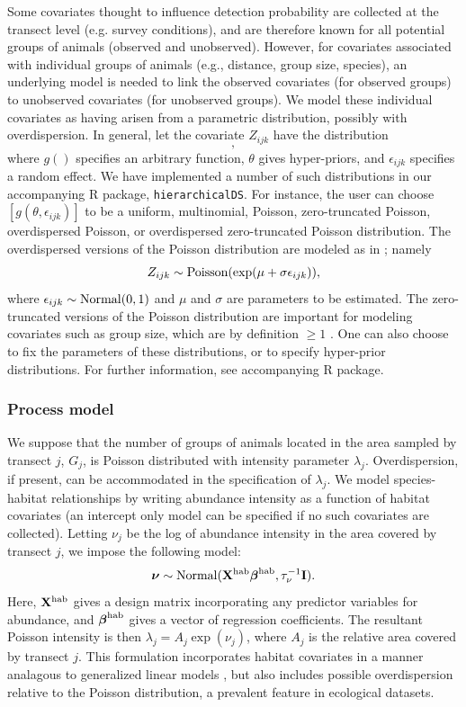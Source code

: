 \documentclass[10pt]{article}
\begin{document}
Some covariates thought to influence detection probability are collected at the transect level (e.g. survey conditions), and are therefore known for all potential groups of animals (observed and unobserved).  However, for covariates associated with individual groups of animals (e.g., distance, group size, species), an underlying model is needed to link the observed covariates (for observed groups) to unobserved covariates (for unobserved groups).  We model these individual covariates as having arisen from a parametric distribution, possibly with overdispersion.  In general, let the covariate $Z_{ijk}$ have the distribution
\begin{equation}
[g(\theta,\epsilon_{ijk})],
\label{eq:cov.dist}
\end{equation}
where $g()$ specifies an arbitrary function, $\theta$ gives hyper-priors, and $\epsilon_{ijk}$ specifies a random effect.  We have implemented a number of such distributions in our accompanying R package, {\tt hierarchicalDS}.  For instance, the user can choose $[g(\theta,\epsilon_{ijk})]$ to be a uniform, multinomial, Poisson, zero-truncated Poisson, overdispersed Poisson, or overdispersed zero-truncated Poisson distribution.  The overdispersed versions of the Poisson distribution are modeled as in \cite{McClintockEtAl2009}; namely
$$
Z_{ijk} \sim {\rm Poisson}(\exp(\mu+\sigma \epsilon_{ijk})),
$$
where $\epsilon_{ijk} \sim {\rm Normal}(0,1)$ and $\mu$ and $\sigma$ are parameters to be estimated.
The zero-truncated versions of the Poisson distribution are important for modeling covariates such as group size, which are by definition $\ge 1$ \cite{Royle2008}.
One can also choose to fix the parameters of these distributions, or to specify hyper-prior distributions.  For further information, see accompanying R package.

\subsubsection*{Process model}

We suppose that the number of groups of animals located in the area sampled by transect $j$, $G_j$, is Poisson distributed with intensity parameter $\lambda_j$.  Overdispersion, if present, can be accommodated in the specification of $\lambda_j$.
We model species-habitat relationships by writing abundance intensity as a function of habitat covariates (an intercept only model can be specified if no such covariates are collected).  Letting $\nu_j$ be the log of abundance intensity in the area covered by transect $j$, we impose the following model:
$$
 \boldsymbol{\nu} \sim {\rm Normal}({\bf X}^{\rm hab}
 \boldsymbol{\beta}^{\rm hab},\tau_\nu^{-1}{\bf I}).
$$
Here, ${\bf X}^{\rm hab}$ gives a design matrix incorporating any predictor variables for abundance, and $\boldsymbol{\beta}^{\rm hab}$ gives a vector of regression coefficients.
The resultant Poisson intensity is then $\lambda_j=A_j \exp(\nu_j)$, where $A_j$ is the relative area covered by transect $j$.  This formulation incorporates habitat covariates in a manner analagous to generalized linear models \cite{McCullaghNelder1989}, but also includes possible overdispersion relative to the Poisson distribution, a prevalent feature in ecological datasets.
\end{document}
